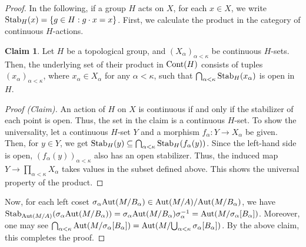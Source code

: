 \documentclass[10pt]{amsart}
\numberwithin{equation}{section}
\theoremstyle{plain}
\theoremstyle{definition}
\newtheorem*{claim}{Claim}
\begin{document}
\begin{proof}
In the following, if a group $H$ acts on $X$, for each $x\in X$, we write ${\rm Stab}_H(x)=\{g\in H:g\cdot x=x\}$.
First, we calculate the product in the category of continuous $H$-actions.

\begin{claim}
Let $H$ be a topological group, and $(X_\alpha)_{\alpha<\kappa}$ be continuous $H$-sets.
Then, the underlying set of their product in ${\rm Cont}(H)$ consists of tuples $(x_\alpha)_{\alpha<\kappa}$, where $x_\alpha\in X_\alpha$ for any $\alpha<\kappa$, such that $\bigcap_{\alpha<\kappa}{\rm Stab}_{H}(x_\alpha)$ is open in $H$.
\end{claim}


\begin{proof}[Proof (Claim)]
An action of $H$ on $X$ is continuous if and only if the stabilizer of each point is open.
Thus, the set in the claim is a continuous $H$-set.
To show the universality, let a continuous $H$-set $Y$ and a morphism $f_\alpha:Y\to X_\alpha$ be given.
Then, for $y\in Y$, we get ${\rm Stab}_{H}(y)\subseteq\bigcap_{\alpha<\kappa}{\rm Stab}_{H}(f_\alpha(y))$.
Since the left-hand side is open, $(f_\alpha(y))_{\alpha<\kappa}$ also has an open stabilizer.
Thus, the induced map $Y\to\prod_{\alpha<\kappa}X_\alpha$ takes values in the subset defined above.
This shows the universal property of the product.
\end{proof}


Now, for each left coset $\sigma_\alpha {\rm Aut}(M/{B_\alpha})\in {\rm Aut}(M/A)/{\rm Aut}(M/{B_\alpha})$, we have ${\rm Stab}_{{\rm Aut}(M/A)}(\sigma_\alpha {\rm Aut}(M/{B_\alpha}))=\sigma_\alpha {\rm Aut}(M/{B_\alpha})\sigma_\alpha^{-1}={\rm Aut}(M/{\sigma_\alpha[B_\alpha]})$.
Moreover, one may see $\bigcap_{\alpha<\kappa}{\rm Aut}(M/{\sigma_\alpha[B_\alpha]})={\rm Aut}(M/{\bigcup_{\alpha<\kappa}\sigma_\alpha[B_\alpha]})$.
By the above claim, this completes the proof.
\end{proof}
\end{document}

